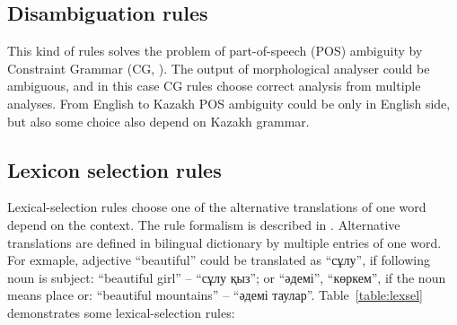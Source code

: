 \documentclass[11pt]{article}
\begin{document}
\subsection{Disambiguation rules}

This kind of rules solves the problem of part-of-speech (POS) ambiguity by Constraint Grammar (CG, \cite{karlsson95}). The 
output of morphological analyser could be ambiguous, and in this case CG rules choose correct analysis from 
multiple analyses. From English to Kazakh POS ambiguity could be only in English side, but also some choice also
depend on Kazakh grammar.

\subsection{Lexicon selection rules }

Lexical-selection rules choose one of the alternative translations of one word depend on the context. The rule 
formalism is described in \cite{tyers12a}. Alternative translations are defined in bilingual dictionary by 
multiple entries of one word. For exmaple, adjective ``beautiful'' could be translated as ``сұлу'', if 
following noun is subject: ``beautiful girl'' -- ``сұлу қыз''; or ``әдемі'', ``көркем'', if the noun means 
place or: ``beautiful mountains'' -- ``әдемі таулар''.  Table~\ref{table:lexsel} demonstrates some 
lexical-selection rules:
\end{document}
